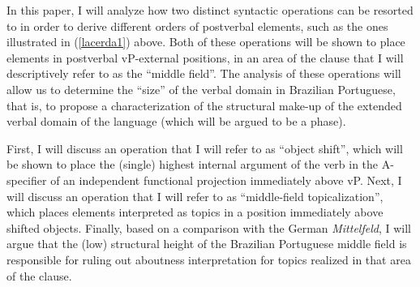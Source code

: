 \documentclass[output=paper]{langscibook}
\begin{document}
In this paper, I will analyze how two distinct syntactic operations can be resorted to in order to derive different orders of postverbal elements, such as the ones illustrated in (\ref{lacerda1}) above. Both of these operations will be shown to place elements in postverbal vP-external positions, in an area of the clause that I will descriptively refer to as the “middle field”. The analysis of these operations will allow us to determine the “size” of the verbal domain in Brazilian Portuguese, that is, to propose a characterization of the structural make-up of the extended verbal domain of the language (which will be argued to be a phase).

First, I will discuss an operation that I will refer to as “object shift”, which will be shown to place the (single) highest internal argument of the verb in the A-specifier of an independent functional projection immediately above vP. Next, I will discuss an operation that I will refer to as “middle-field topicalization”, which places elements interpreted as topics in a position immediately above shifted objects. Finally, based on a comparison with the German \emph{Mittelfeld}, I will argue that the (low) structural height of the Brazilian Portuguese middle field is responsible for ruling out aboutness interpretation for topics realized in that area of the clause.

\largerpage[2]
\end{document}
